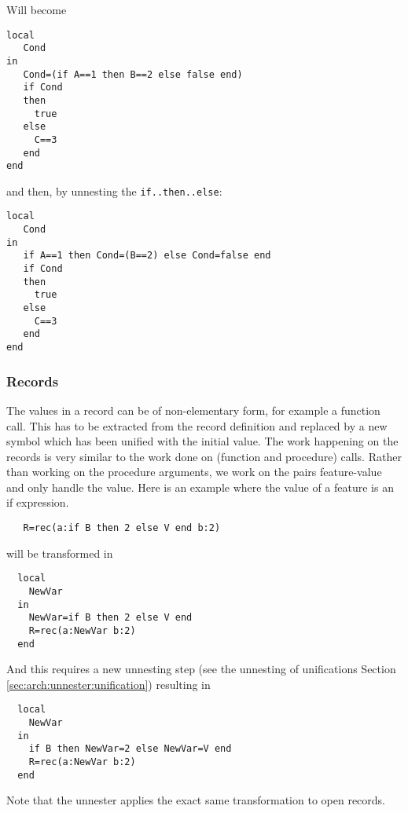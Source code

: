 \documentclass[a4paper]{memoir}
\begin{document}
Will become

\begin{lstlisting}
local
   Cond
in
   Cond=(if A==1 then B==2 else false end)
   if Cond
   then
     true
   else
     C==3
   end
end
\end{lstlisting}
and then, by unnesting the \lstinline!if..then..else!:
\begin{lstlisting}
local
   Cond
in
   if A==1 then Cond=(B==2) else Cond=false end
   if Cond
   then
     true
   else
     C==3
   end
end
\end{lstlisting}
\subsubsection{Records}\label{sec:arch:unnester:records}
The values in a record can be of non-elementary form, for example a function call. This has to be extracted from the record definition and replaced by a new symbol which has been unified with the initial value. The work happening on the records is very similar to the work done on (function and procedure) calls. Rather than working on the procedure arguments, we work on the pairs feature-value and only handle the value. 
Here is an example where the value of a feature is an if expression.
\begin{lstlisting}
   R=rec(a:if B then 2 else V end b:2)
\end{lstlisting}
will be transformed in
\begin{lstlisting}
  local
    NewVar
  in
    NewVar=if B then 2 else V end
    R=rec(a:NewVar b:2)
  end
\end{lstlisting}
And this requires a new unnesting step (see the unnesting of unifications Section \ref{sec:arch:unnester:unification}) resulting in 
\begin{lstlisting}
  local
    NewVar
  in
    if B then NewVar=2 else NewVar=V end
    R=rec(a:NewVar b:2)
  end
\end{lstlisting}

Note that the unnester applies the exact same transformation to open records.
\end{document}
